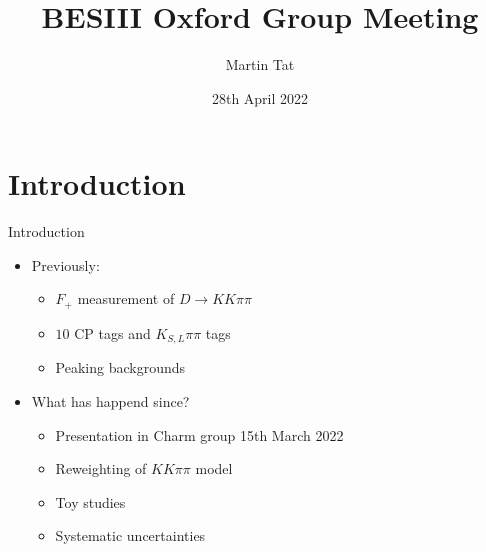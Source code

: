 \documentclass{beamer}
\title[BESIII Oxford]{BESIII Oxford Group Meeting}
\author{Martin Tat}
\institute{Oxford LHCb}
\date{28th April 2022}
\begin{document}
\begin{frame}
  \titlepage
\end{frame}


\section{Introduction}

\begin{frame}{Introduction}
  \begin{itemize}
    \setlength\itemsep{1.0em}
    \item{Previously:}
    \begin{itemize}
      \item{$F_+$ measurement of $D\to KK\pi\pi$}
      \item{$10$ CP tags and $K_{S, L}\pi\pi$ tags}
      \item{Peaking backgrounds}
    \end{itemize}
    \item{What has happend since?}
    \begin{itemize}
      \item{Presentation in Charm group 15th March 2022}
      \item{Reweighting of $KK\pi\pi$ model}
      \item{Toy studies}
      \item{Systematic uncertainties}
    \end{itemize}
  \end{itemize}
\end{frame}
\end{document}
